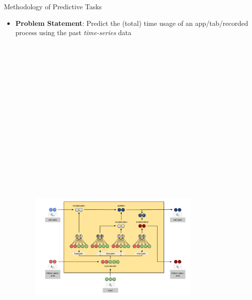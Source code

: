 \documentclass[final]{beamer}
\newlength{\colwidth}
\begin{document}
\begin{frame}[t]
\begin{columns}[t]
\begin{column}{\colwidth}
\begin{exampleblock}{\huge{Methodology of Predictive Tasks}}
{\begin{itemize}
          \end{itemize}


          \begin{itemize}
            \item \textbf{Problem Statement}: Predict the (total) time usage of an app/tab/recorded process using the past \textit{time-series} data
                  \begin{figure}\hspace*{-2cm}\includegraphics[width=0.8\textwidth, height=22cm]{lstm-lt.jpeg}\end{figure}


\end{itemize}}
\end{exampleblock}
\end{column}
\end{columns}
\end{frame}
\end{document}
